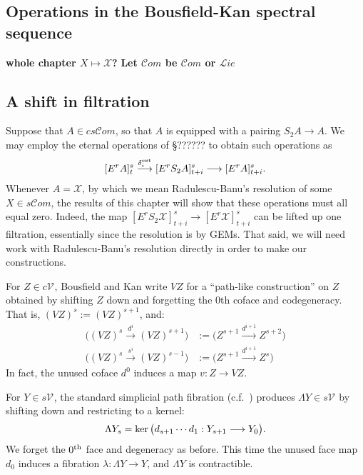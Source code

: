 \documentclass[11pt]{amsart}
\theoremstyle{plain}
\theoremstyle{definition}
\renewcommand{\ker}{\textup{ker}\,}
\renewcommand{\to}{\longrightarrow}
\newcommand{\scrL}{\mathscr{L}}
\newcommand{\scrC}{\mathscr{C}}
\newcommand{\calX}{\mathcal{X}}
\newcommand{\calV}{\mathcal{V}}
\theoremstyle{plain}
\newcommand{\vect}[2]{\calV^{#1}_{#2}}
\newcommand{\algs}{{\scrC\!\textit{om}}}
\newcommand{\liealgs}{{\scrL\!\textit{ie}}}
\newcommand{\E}[5]{[E^{#1}_{#2}#3]^{#4}_{#5}}
\begin{document}
\begin{Operations on the Bousfield-Kan spectral sequence}
\section{\textbf{Operations in the Bousfield-Kan spectral sequence}}\label{Operations on the Bousfield-Kan spectral sequence}
\textbf{whole chapter $X\mapsto \calX$?}
\textbf{Let $\algs$ be $\algs$ or $\liealgs$}
\subsection{A shift in filtration}
Suppose that $A\in cs\algs$, so that $A$ is equipped with a pairing $S_2A\to A$. We may employ the eternal operations of \S?????? to obtain such operations as
\[\E{r}{}{A}{s}{t}\overset{\delta_i^\textup{ext}}{\to} \E{r}{}{S_2A}{s}{t+i}\to \E{r}{}{A}{s}{t+i}.\]
Whenever $A=\calX$, by which we mean Radulescu-Banu's resolution of some $X\in s\algs$, the results of this chapter will show that these operations must all equal zero. Indeed, the map $\E{r}{}{S_2\calX}{s}{t+i}\to \E{r}{}{\calX}{s}{t+i}$ can be lifted up one filtration, essentially since the resolution is by GEMs. That said, we will need work with  Radulescu-Banu's resolution directly in order to make our constructions.

\begin{shaded}\tiny
For $Z\in c\vect{}{}$, Bousfield and Kan write $VZ$ for a ``path-like construction'' \cite[\S3.1]{BK_pairings_products.pdf} on $Z$ obtained by shifting $Z$ down and forgetting the 0th coface and codegeneracy. That is, $(VZ)^s:=(VZ)^{s+1}$, and:
\begin{align*}
\bigl((VZ)^s\overset{d^i}{\to} (VZ)^{s+1}\bigr)&:=\bigl(Z^{s+1}\overset{d^{i+1}}{\to} Z^{s+2}\bigr)\\
\bigl((VZ)^s\overset{s^i}{\to} (VZ)^{s-1}\bigr)&:=\bigl(Z^{s+1}\overset{d^{i+1}}{\to} Z^{s}\bigr)
\end{align*}
In fact, the unused coface $d^0$ induces a map $v:Z\to VZ$.

For $Y\in s\vect{}{}$, the standard simplicial path fibration (c.f.\ \cite[p.82]{BousKanSSeq.pdf}) produces $\Lambda Y\in s\vect{}{}$ by shifting down and restricting to a kernel:
\[\Lambda Y_s=\ker\bigl(d_{s+1}\cdots d_1:Y_{s+1}\to Y_0\bigr).\]
We forget the $0^\textup{th}$ face and degeneracy as before. This time the unused face map $d_0$ induces a fibration $\lambda:\Lambda Y\to Y$, and $\Lambda Y$ is  contractible.




\end{shaded}
\end{Operations on the Bousfield-Kan spectral sequence}
\end{document}

